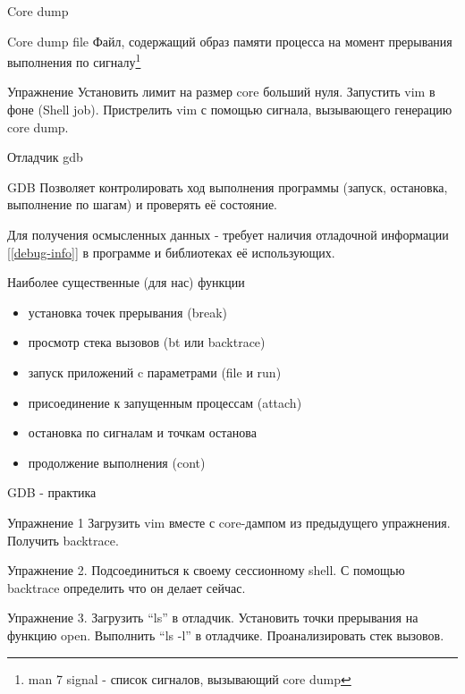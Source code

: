 \begin{frame}{Core dump}
  \begin{block}{Core dump file}
    Файл, содержащий образ памяти процесса на момент прерывания выполнения по сигналу\footnote{man 7 signal - список сигналов, вызывающий core dump}
  \end{block} 

  \alert{Упражнение} Установить лимит на размер core больший нуля. Запустить vim в фоне (Shell job). Пристрелить vim с помощью сигнала, вызывающего генерацию core dump. \pause

\end{frame}

\begin{frame}{Отладчик gdb}
  \begin{block}{GDB}
    Позволяет контролировать ход выполнения программы (запуск, остановка, выполнение по шагам) и проверять её состояние. 
  \end{block} 
  Для получения осмысленных данных - требует наличия отладочной информации [\ref{debug-info}] в программе и библиотеках её использующих.  \pause
   
  \begin{block}{Наиболее существенные (для нас) функции}
    \begin{itemize}
      \item установка точек прерывания (\alert{break})
      \item просмотр стека вызовов (\alert{bt} или \alert{backtrace})
      \item запуск приложений c параметрами (\alert{file} и \alert{run})
      \item присоединение к запущенным процессам (\alert{attach})
      \item остановка по сигналам и точкам останова
      \item продолжение выполнения (\alert{cont})
    \end{itemize}
  \end{block}
\end{frame}

\begin{frame}{GDB - практика}

  \alert{Упражнение 1} Загрузить vim вместе с core-дампом из предыдущего упражнения. Получить backtrace.

  \alert{Упражнение 2}. Подсоединиться к своему сессионному shell. С помощью backtrace определить что он делает сейчас.

  \alert{Упражнение 3}. Загрузить ``ls'' в отладчик. Установить точки прерывания на функцию open. Выполнить ``ls -l'' в отладчике. Проанализировать стек вызовов.

\end{frame}

